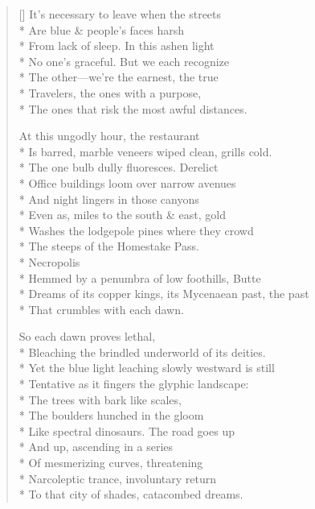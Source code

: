 \label{ch:leaving_butte}
\settowidth{\versewidth}{Dreams of its copper kings, its Mycenaean past, the past}
\begin{verse}[\versewidth]
It's necessary to leave when the streets \\*
Are blue \& people's faces harsh\\*
From lack of sleep. In this ashen light\\*
No one's graceful.  But we each recognize\\*
The other---we're the earnest, the true\\*
Travelers, the ones with a purpose,\\*
The ones that risk the most awful distances.

At this ungodly hour, the restaurant\\*
Is barred, marble veneers wiped clean, grills cold.\\*
The one bulb dully fluoresces. Derelict \\*
Office buildings loom over narrow avenues\\*
And night lingers in those canyons\\*
Even as, miles to the south \& east, gold\\*
Washes the lodgepole pines where they crowd\\*
The steeps of the Homestake Pass.\\*
 \qquad  \qquad  \qquad  \qquad  \qquad Necropolis\\*
Hemmed by a penumbra of low foothills, Butte\\*
Dreams of its copper kings, its Mycenaean past, the past\\*
That crumbles with each dawn.

So each dawn proves lethal,\\*
Bleaching the brindled underworld of its deities.\\*
Yet the blue light leaching slowly westward is still\\*
Tentative as it fingers the glyphic landscape:\\*
The trees with bark like scales,\\*
The boulders hunched in the gloom\\*
Like spectral dinosaurs.  The road goes up\\*
And up, ascending in a series\\*
Of mesmerizing curves, threatening\\*
Narcoleptic trance, involuntary return\\*
To that city of shades, catacombed dreams.


\end{verse}
